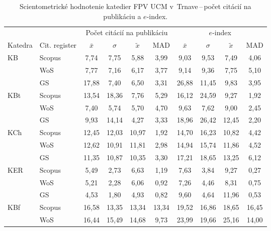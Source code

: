 \begin{table}
  \centering\small
  \caption[Hodnotenie FPV\,--\,počet citácií na publikáciu a $e$-index]{Scientometrické hodnotenie katedier FPV UCM v~Trnave\,--\,počet citácií na publikáciu a $e$-index.}
\label{tab:2-staff.results}
\begin{tabularx}{\textwidth}{XXcccc@{\hspace{3ex}}cccc}
  \toprule\noalign{\vspace{.3ex}}
           &       & \multicolumn{4}{c}{Počet citácií na publikáciu} &  \multicolumn{4}{c}{$e$-index} \\
 Katedra  & Cit. register & $\bar{x}$      & $\sigma$  & $\tilde{x}$ & MAD  & $\bar{x}$      & $\sigma$  & $\tilde{x}$  & MAD  \\[0.3ex]
  \midrule\noalign{\vspace{.5ex}}
 KB   & Scopus & 7,74        & 7,75  & 5,88  & 3,99  & 9,03    & 9,53  & 7,49  & 4,06  \\
      & WoS    & 7,77        & 7,16  & 6,17  & 3,77  & 9,14    & 9,36  & 7,75  & 5,10  \\
      & GS     & 17,88       & 7,40  & 6,50  & 3,31  & 26,88   & 11,45 & 9,83  & 3,95  \\[3ex]
 KBt  & Scopus & 13,54       & 18,36 & 7,76  & 5,29  & 16,12   & 24,59 & 9,27  & 1,92  \\
      & WoS    & 7,40        & 5,74  & 5,70  & 4,70  & 9,63    & 7,62  & 9,00  & 2,45  \\
      & GS     & 9,93        & 14,14 & 4,27  & 3,33  & 18,96   & 26,42 & 12,45 & 2,20  \\[3ex]
 KCh  & Scopus & 12,45       & 12,03 & 10,97 & 1,92  & 14,70   & 16,23 & 10,82 & 4,42  \\
      & WoS    & 12,62       & 10,91 & 11,81 & 2,98  & 14,94   & 15,74 & 11,86 & 4,52  \\
      & GS     & 11,35       & 10,87 & 10,35 & 3,30  & 17,21   & 18,65 & 13,25 & 6,12  \\[3ex]
 KER  & Scopus & 5,49        & 2,73  & 6,63  & 1,19  & 7,63    & 3,84  & 9,27  & 0,27  \\
      & WoS    & 5,21        & 2,28  & 6,06  & 0,92  & 7,26    & 4,46  & 8,31  & 0,75  \\
      & GS     & 4,53        & 1,80  & 4,93  & 0,82  & 9,60    & 4,64  & 11,96 & 0,53  \\[3ex]
 KBf  & Scopus & 16,58       & 13,35 & 13,34 & 13,34 & 19,52   & 16,86 & 18,65 & 16,45 \\
      & WoS    & 16,44       & 15,49 & 14,68 & 9,73  & 23,99   & 19,66 & 25,16 & 14,00 \\

\end{tabularx}
\end{table}
